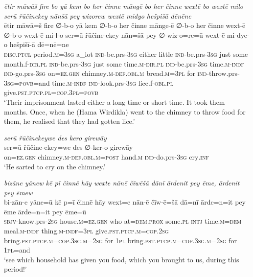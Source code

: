 \ea \label{BP.149}
\textit{ētir māwāš fire bo yā kem bo her činne māngē bo her činne wextē bo wextē milo serū řūčinekey nānšā pey wizorew wextē miđyo hešpišā dēnēne} \\ 
\gll ētir māwā=š fire ∅-b-o yā kem ∅-b-o her činne mānge-ē ∅-b-o her činne wext-ē ∅-b-o wext-ē mi-l-o ser=ū řūčine-ekey nān=šā pey ∅-wiz-o=re=ū wext-ē mi-đye-o hešpišī-ā dē=nē=ne \\ 
 \textsc{disc.ptcl} period\textsc{.m}\textsc{=3sg} a\_lot \textsc{ind-}be.prs\textsc{-3sg} either little \textsc{ind-}be.prs\textsc{-3sg} just some month.f\textsc{-dir}\textsc{.pl} \textsc{ind-}be.prs\textsc{-3sg} just some time\textsc{.m}\textsc{-dir}\textsc{.pl} \textsc{ind-}be.prs\textsc{-3sg} time\textsc{.m}\textsc{-indf} \textsc{ind-}go.prs\textsc{-3sg} on\textsc{=ez.gen} chimney\textsc{.m}\textsc{-def}\textsc{.obl}\textsc{.m} bread\textsc{.m}\textsc{=3pl} for \textsc{ind-}throw.prs\textsc{-3sg}\textsc{=\textsc{povb}}=and time\textsc{.m}\textsc{-indf} \textsc{ind-}look.prs\textsc{-3sg} lice.f\textsc{-obl}\textsc{.pl} give\textsc{.pst}\textsc{.ptcp}\textsc{.pl}\textsc{=cop}\textsc{.3pl}\textsc{=\textsc{povb}} \\ 
\glt `Their imprisonment lasted either a long time or short time. It took them months. Once, when he (Hama Wirdikla) went to the chimney to throw food for them, he realised that they had gotten lice.'
\z 
 
\ea \label{BP.153}
\textit{serū řūčinekeywe des kero girewāy} \\ 
\gll ser=ū řūčine-ekey=we des ∅-ker-o girewāy \\ 
 on\textsc{=ez.gen} chimney\textsc{.m}\textsc{-def}\textsc{.obl}\textsc{.m}\textsc{=\textsc{post}} hand\textsc{.m} \textsc{ind-}do.prs\textsc{-3sg} cry\textsc{.inf} \\ 
\glt `He sarted to cry on the chimney.'
\z 
 
\ea \label{BP.161}
\textit{bizāne yānew kē pī činnē hāy wexte nānē čīwēšā dānī ārdenit pey ēme, ārdenit pey ēmew} \\ 
\gll bi-zān-e yāne=ū kē p=ī činnē hāy wext=e nān-ē čīw-ē=šā dā=nī ārde=n=it pey ēme ārde=n=it pey ēme=ū \\ 
 \textsc{sbjv-}know.prs-\textsc{2sg} house\textsc{.m}\textsc{=ez.gen} who at=\textsc{dem.prox} some\textsc{.pl} \textsc{intj} time\textsc{.m}\textsc{=dem} meal\textsc{.m}\textsc{-indf} thing\textsc{.m}\textsc{-indf}\textsc{=3pl} give\textsc{.pst}\textsc{.ptcp}\textsc{.m}\textsc{=cop}\textsc{.\textsc{2sg}} bring\textsc{.pst}\textsc{.ptcp}\textsc{.m}\textsc{=cop}\textsc{.3sg}\textsc{.m}\textsc{=\textsc{2sg}} for \textsc{1pl} bring\textsc{.pst}\textsc{.ptcp}\textsc{.m}\textsc{=cop}\textsc{.3sg}\textsc{.m}\textsc{=\textsc{2sg}} for \textsc{1pl}=and \\ 
\glt `see which household has given you food, which you brought to us, during this period!'
\z 
 
